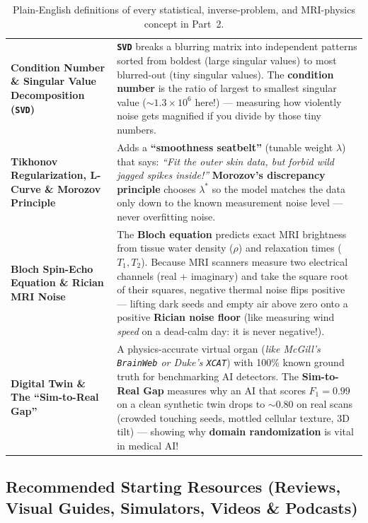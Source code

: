 \documentclass[10.5pt,a4paper]{article}
\begin{document}
\begin{table}[H]
\begin{tabularx}{\textwidth}{L{3.55cm} Y}
\textbf{Condition Number \& Singular Value Decomposition (\texttt{SVD})} & \textbf{\texttt{SVD}} breaks a blurring matrix into independent patterns sorted from boldest (large singular values) to most blurred-out (tiny singular values). The \textbf{condition number} is the ratio of largest to smallest singular value ($\sim 1.3\times 10^6$ here!) --- measuring how violently noise gets magnified if you divide by those tiny numbers. \\
\textbf{Tikhonov Regularization, L-Curve \& Morozov Principle} & Adds a \textbf{``smoothness seatbelt''} (tunable weight $\lambda$) that says: \emph{``Fit the outer skin data, but forbid wild jagged spikes inside!''} \textbf{Morozov's discrepancy principle} chooses $\lambda^*$ so the model matches the data only down to the known measurement noise level --- never overfitting noise. \\
\textbf{Bloch Spin-Echo Equation \& Rician MRI Noise} & The \textbf{Bloch equation} predicts exact MRI brightness from tissue water density ($\rho$) and relaxation times ($T_1, T_2$). Because MRI scanners measure two electrical channels (real + imaginary) and take the square root of their squares, negative thermal noise flips positive --- lifting dark seeds and empty air above zero onto a positive \textbf{Rician noise floor} (like measuring wind \emph{speed} on a dead-calm day: it is never negative!). \\
\textbf{Digital Twin \& The ``Sim-to-Real Gap''} & A physics-accurate virtual organ (\emph{like McGill's \texttt{BrainWeb} or Duke's \texttt{XCAT}}) with 100\% known ground truth for benchmarking AI detectors. The \textbf{Sim-to-Real Gap} measures why an AI that scores $F_1 = 0.99$ on a clean synthetic twin drops to $\sim 0.80$ on real scans (crowded touching seeds, mottled cellular texture, 3D tilt) --- showing why \textbf{domain randomization} is vital in medical AI! \\
\bottomrule
\end{tabularx}
\caption{Plain-English definitions of every statistical, inverse-problem, and MRI-physics concept in Part~2.}
\label{tab:lab5-p2-defs}
\end{table}

\newpage
\subsection{Recommended Starting Resources (Reviews, Visual Guides, Simulators, Videos \& Podcasts)}
\end{document}
